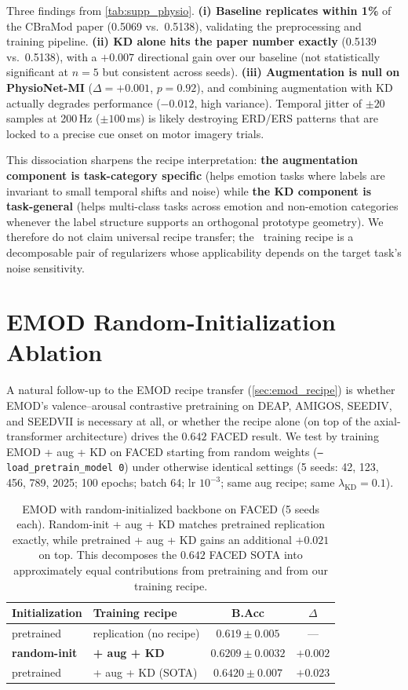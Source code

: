 Three findings from \cref{tab:supp_physio}. \textbf{(i) Baseline replicates within 1\%} of the CBraMod paper (0.5069 vs.\ 0.5138), validating the preprocessing and training pipeline. \textbf{(ii) KD alone hits the paper number exactly} (0.5139 vs.\ 0.5138), with a $+0.007$ directional gain over our baseline (not statistically significant at $n=5$ but consistent across seeds). \textbf{(iii) Augmentation is null on PhysioNet-MI} ($\Delta=+0.001$, $p=0.92$), and combining augmentation with KD actually degrades performance ($-0.012$, high variance). Temporal jitter of $\pm 20$ samples at 200\,Hz ($\pm 100$\,ms) is likely destroying ERD/ERS patterns that are locked to a precise cue onset on motor imagery trials.

This dissociation sharpens the recipe interpretation: \textbf{the augmentation component is task-category specific} (helps emotion tasks where labels are invariant to small temporal shifts and noise) while \textbf{the KD component is task-general} (helps multi-class tasks across emotion and non-emotion categories whenever the label structure supports an orthogonal prototype geometry). We therefore do not claim universal recipe transfer; the \ours\ training recipe is a decomposable pair of regularizers whose applicability depends on the target task's noise sensitivity.

\section{EMOD Random-Initialization Ablation}
\label{sec:supp_emod_randinit}

A natural follow-up to the EMOD recipe transfer (\cref{sec:emod_recipe}) is whether EMOD's valence--arousal contrastive pretraining on DEAP, AMIGOS, SEEDIV, and SEEDVII is necessary at all, or whether the recipe alone (on top of the axial-transformer architecture) drives the $0.642$ FACED result. We test by training EMOD + aug + KD on FACED starting from random weights (\texttt{--load\_pretrain\_model 0}) under otherwise identical settings (5 seeds: 42, 123, 456, 789, 2025; 100 epochs; batch 64; lr $10^{-3}$; same aug recipe; same $\lambda_{\text{KD}}=0.1$).

\begin{table}[!h]
\caption{EMOD with random-initialized backbone on FACED (5 seeds each). Random-init + aug + KD matches pretrained replication exactly, while pretrained + aug + KD gains an additional $+0.021$ on top. This decomposes the $0.642$ FACED SOTA into approximately equal contributions from pretraining and from our training recipe.}
\small
\centering
\begin{tabular}{llcc}
\toprule
Initialization & Training recipe & B.Acc & $\Delta$ \\
\midrule
pretrained & replication (no recipe) & $0.619 \pm 0.005$ & --- \\
\rowcolor{blond}
\textbf{random-init} & \textbf{+ aug + KD} & $\mathbf{0.6209 \pm 0.0032}$ & $+0.002$ \\
pretrained & + aug + KD (SOTA) & $\mathbf{0.6420 \pm 0.007}$ & $+0.023$ \\
\bottomrule
\end{tabular}
\label{tab:supp_emod_randinit}
\end{table}

